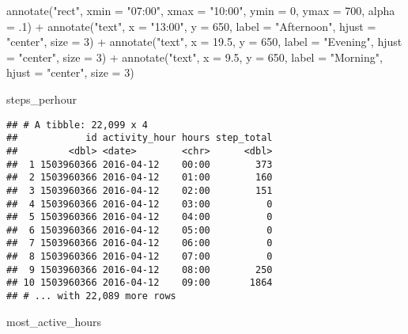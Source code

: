 \documentclass[
]{article}
\newenvironment{Shaded}{\begin{snugshade}}{\end{snugshade}}
\newcommand{\AttributeTok}[1]{\textcolor[rgb]{0.77,0.63,0.00}{#1}}
\newcommand{\DecValTok}[1]{\textcolor[rgb]{0.00,0.00,0.81}{#1}}
\newcommand{\FloatTok}[1]{\textcolor[rgb]{0.00,0.00,0.81}{#1}}
\newcommand{\FunctionTok}[1]{\textcolor[rgb]{0.00,0.00,0.00}{#1}}
\newcommand{\NormalTok}[1]{#1}
\newcommand{\SpecialCharTok}[1]{\textcolor[rgb]{0.00,0.00,0.00}{#1}}
\newcommand{\StringTok}[1]{\textcolor[rgb]{0.31,0.60,0.02}{#1}}
\begin{document}
\begin{Shaded}
\begin{Highlighting}[]
   \FunctionTok{annotate}\NormalTok{(}\StringTok{"rect"}\NormalTok{,  }\AttributeTok{xmin =} \StringTok{"07:00"}\NormalTok{, }\AttributeTok{xmax =} \StringTok{"10:00"}\NormalTok{, }
            \AttributeTok{ymin =} \DecValTok{0}\NormalTok{, }\AttributeTok{ymax =} \DecValTok{700}\NormalTok{, }\AttributeTok{alpha =}\NormalTok{ .}\DecValTok{1}\NormalTok{) }\SpecialCharTok{+}
      \FunctionTok{annotate}\NormalTok{(}\StringTok{"text"}\NormalTok{, }\AttributeTok{x =} \StringTok{"13:00"}\NormalTok{, }\AttributeTok{y =} \DecValTok{650}\NormalTok{, }
            \AttributeTok{label =} \StringTok{"Afternoon"}\NormalTok{, }\AttributeTok{hjust =} \StringTok{"center"}\NormalTok{, }\AttributeTok{size =} \DecValTok{3}\NormalTok{) }\SpecialCharTok{+}
   \FunctionTok{annotate}\NormalTok{(}\StringTok{"text"}\NormalTok{, }\AttributeTok{x =} \FloatTok{19.5}\NormalTok{, }\AttributeTok{y =} \DecValTok{650}\NormalTok{, }
            \AttributeTok{label =} \StringTok{"Evening"}\NormalTok{, }\AttributeTok{hjust =} \StringTok{"center"}\NormalTok{, }\AttributeTok{size =} \DecValTok{3}\NormalTok{) }\SpecialCharTok{+}
    \FunctionTok{annotate}\NormalTok{(}\StringTok{"text"}\NormalTok{, }\AttributeTok{x =} \FloatTok{9.5}\NormalTok{, }\AttributeTok{y =} \DecValTok{650}\NormalTok{,}
          \AttributeTok{label =} \StringTok{"Morning"}\NormalTok{, }\AttributeTok{hjust =} \StringTok{"center"}\NormalTok{, }\AttributeTok{size =} \DecValTok{3}\NormalTok{)}

 

\NormalTok{ steps\_perhour}
\end{Highlighting}
\end{Shaded}

\begin{verbatim}
## # A tibble: 22,099 x 4
##            id activity_hour hours step_total
##         <dbl> <date>        <chr>      <dbl>
##  1 1503960366 2016-04-12    00:00        373
##  2 1503960366 2016-04-12    01:00        160
##  3 1503960366 2016-04-12    02:00        151
##  4 1503960366 2016-04-12    03:00          0
##  5 1503960366 2016-04-12    04:00          0
##  6 1503960366 2016-04-12    05:00          0
##  7 1503960366 2016-04-12    06:00          0
##  8 1503960366 2016-04-12    07:00          0
##  9 1503960366 2016-04-12    08:00        250
## 10 1503960366 2016-04-12    09:00       1864
## # ... with 22,089 more rows
\end{verbatim}

\begin{Shaded}
\begin{Highlighting}[]
\NormalTok{ most\_active\_hours}
\end{Highlighting}
\end{Shaded}
\end{document}
